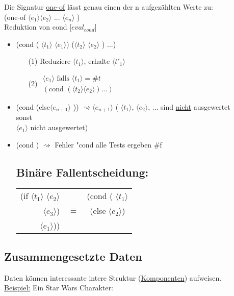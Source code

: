 \documentclass[a4paper,12pt]{article}
\begin{document}
Die Signatur \uline{one-of} lässt genau einen der n aufgezählten Werte zu:\\
(one-of $\langle e_1\rangle \langle e_2\rangle$ ... $\langle e_n\rangle$ )
\\
Reduktion von cond [$eval_{cond}$]
\begin{itemize}
\item (cond ( $\langle t_1 \rangle$ $\langle e_1 \rangle$) ($\langle t_2 \rangle$ $\langle e_2 \rangle$ ) ...)
\begin{itemize}
\item[(1)] Reduziere $\langle t_1 \rangle$, erhalte $\langle t'_1 \rangle$
\item[(2)] $\begin{array}{l} \langle e_1 \rangle \text{ falls } \langle t_1 \rangle = \#t\\
(\text{cond } (\langle t_2 \rangle \langle e_2 \rangle)...)
\end{array}$
\end{itemize}
\item (cond (else$\langle e_{n+1} \rangle$ )) $\rightsquigarrow \langle e_{n+1} \rangle$
( $\langle t_1 \rangle$, $\langle e_2 \rangle$, ... sind \uline{nicht} ausgewertet\\
sonst \\
 $\langle e_1 \rangle$ nicht ausgewertet)
\item (cond ) $\rightsquigarrow$ Fehler "cond alle Tests ergeben \#f

\subsection{Binäre Fallentscheidung:}
\begin{tabular}{rcc}

(if  $\langle t_1 \rangle$  $\langle e_2 \rangle$ 	&		  & (cond ( $\langle t_1 \rangle$ \\
$\langle e_3 \rangle$) 								&$\equiv$ &(else  $\langle e_2 \rangle$) \\
$\langle e_1 \rangle$))								&		  & \														 
\end{tabular}
\end{itemize}
\subsection{Zusammengesetzte Daten}
Daten können interessante intere Struktur (\uline{Komponenten}) aufweisen.\\
\uline{Beispiel:} Ein Star Wars Charakter:\\
\end{document}
